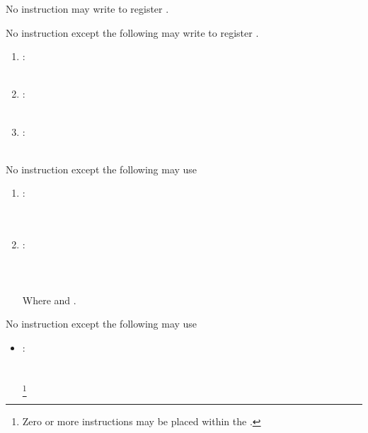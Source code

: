 
\specitem
No instruction may write to register \rbase.

\specitem
No instruction except the following may write to register \rsp.

\begin{enumerate}
    \item
        : \\
         \\
    \item
        : \\
         \\
    \item
        : \\
         \\
\end{enumerate}


\specitem
\label{specitem:x64_jmpq}
No instruction except the following may use 

\begin{enumerate}
    \item
        : \\
         \\
         \\
    \item
        : \\
         \\
         \\ \\
        Where  and .
\end{enumerate}

\specitem
No instruction except the following may use 

\begin{itemize}
    \item
        : \\
         \\
         \\
        \footnote{Zero or more  instructions may be placed within the .} \\
\end{itemize}

